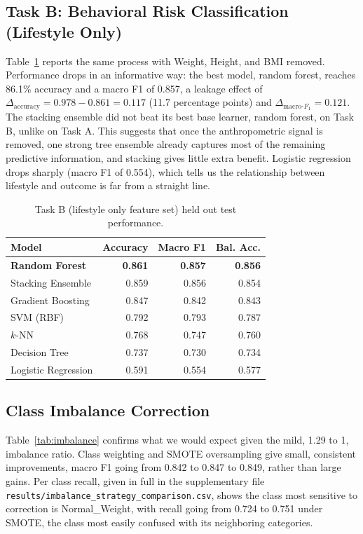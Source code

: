 \documentclass[journal]{IEEEtran}
\begin{document}
\subsection{Task B: Behavioral Risk Classification (Lifestyle Only)}
\label{sec:results-taskB}
Table~\ref{tab:clfB} reports the same process with Weight, Height, and BMI removed. Performance drops in an informative way: the best model, random forest, reaches 86.1\% accuracy and a macro F1 of 0.857, a leakage effect of $\Delta_{\text{accuracy}} = 0.978 - 0.861 = 0.117$ (11.7 percentage points) and $\Delta_{\text{macro-}F_1} = 0.121$. The stacking ensemble did not beat its best base learner, random forest, on Task B, unlike on Task A. This suggests that once the anthropometric signal is removed, one strong tree ensemble already captures most of the remaining predictive information, and stacking gives little extra benefit. Logistic regression drops sharply (macro F1 of 0.554), which tells us the relationship between lifestyle and outcome is far from a straight line.

\begin{table}[t]
\centering
\caption{Task B (lifestyle only feature set) held out test performance.}
\label{tab:clfB}
\begin{tabular}{lrrr}
\toprule
Model & Accuracy & Macro F1 & Bal. Acc. \\
\midrule
\textbf{Random Forest} & \textbf{0.861} & \textbf{0.857} & \textbf{0.856} \\
Stacking Ensemble & 0.859 & 0.856 & 0.854 \\
Gradient Boosting & 0.847 & 0.842 & 0.843 \\
SVM (RBF) & 0.792 & 0.793 & 0.787 \\
$k$-NN & 0.768 & 0.747 & 0.760 \\
Decision Tree & 0.737 & 0.730 & 0.734 \\
Logistic Regression & 0.591 & 0.554 & 0.577 \\
\bottomrule
\end{tabular}
\end{table}

\subsection{Class Imbalance Correction}
Table~\ref{tab:imbalance} confirms what we would expect given the mild, 1.29 to 1, imbalance ratio. Class weighting and SMOTE oversampling give small, consistent improvements, macro F1 going from 0.842 to 0.847 to 0.849, rather than large gains. Per class recall, given in full in the supplementary file \texttt{results/imbalance\_strategy\_comparison.csv}, shows the class most sensitive to correction is Normal\_Weight, with recall going from 0.724 to 0.751 under SMOTE, the class most easily confused with its neighboring categories.
\end{document}
